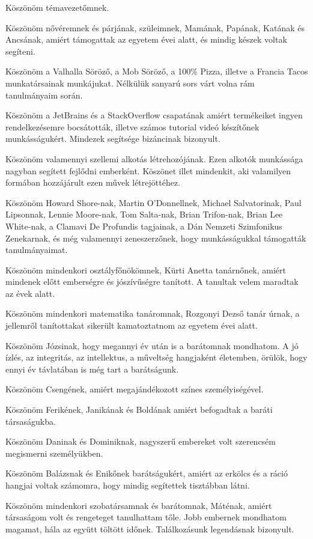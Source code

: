 Köszönöm témavezetőmnek.

Köszönöm nővéremnek és párjának, szüleimnek, Mamának, Papának, Katának és Ancsának, amiért támogattak az egyetem évei alatt, és mindig készek voltak segíteni.

Köszönöm a Valhalla Söröző, a Mob Söröző, a 100\% Pizza, illetve a Francia Tacos munkatársainak munkájukat. Nélkülük sanyarú sors várt volna rám tanulmányaim során.

Köszönöm a JetBrains és a StackOverflow csapatának amiért termékeiket ingyen rendelkezésemre bocsátották, illetve számos tutorial videó készítőnek munkásságukért. Mindezek segítsége bizáncinak bizonyult.

Köszönöm valamennyi szellemi alkotás létrehozójának. Ezen alkotók munkássága nagyban segített fejlődni emberként. Köszönet illet mindenkit, aki valamilyen formában hozzájárult ezen művek létrejöttéhez.

Köszönöm Howard Shore-nak, Martin O'Donnellnek, Michael Salvatorinak, Paul Lipsonnak, Lennie Moore-nak, Tom Salta-nak, Brian Trifon-nak, Brian Lee White-nak, a Clamavi De Profundis tagjainak, a Dán Nemzeti Szimfonikus Zenekarnak, és még valamennyi zeneszerzőnek, hogy munkásságukkal támogatták tanulmányaimat.

Köszönöm mindenkori osztályfőnökömnek, Kürti Anetta tanárnőnek, amiért mindenek előtt emberségre és jószívűségre tanított. A tanultak velem maradtak az évek alatt.

Köszönöm mindenkori matematika tanáromnak, Rozgonyi Dezső tanár úrnak, a jellemről tanítottakat sikerült kamatoztatnom az egyetem évei alatt.

Köszönöm Józsinak, hogy megannyi év után is a barátomnak mondhatom. A jó ízlés, az integritás, az intellektus, a műveltség hangjaként életemben, örülök, hogy ennyi év távlatában is még tart a barátságunk.

Köszönöm Csengének, amiért megajándékozott színes személyiségével.

Köszönöm Ferikének, Janikának és Boldának amiért befogadtak a baráti társaságukba. 

Köszönöm Daninak és Dominiknak, nagyszerű embereket volt szerencsém megismerni személyükben.

Köszönöm Balázsnak és Enikőnek barátságukért, amiért az erkölcs és a ráció hangjai voltak számomra, hogy mindig segítettek tisztábban látni.

Köszönöm mindenkori szobatársamnak és barátomnak, Máténak, amiért társaságom volt és rengeteget tanulhattam tőle. Jobb embernek mondhatom magamat, hála az együtt töltött időnek. Találkozásunk legendásnak bizonyult. 

